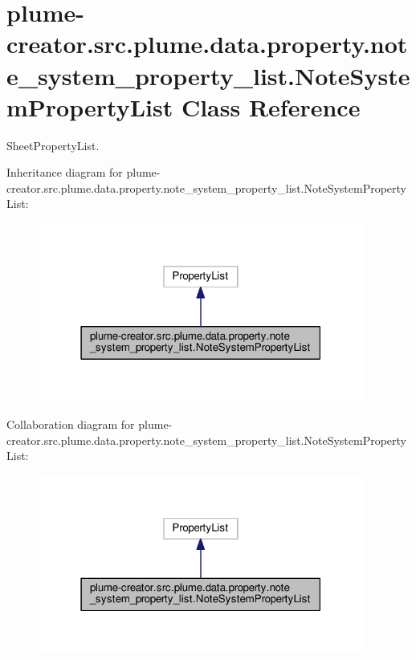 \hypertarget{classplume-creator_1_1src_1_1plume_1_1data_1_1property_1_1note__system__property__list_1_1_note_system_property_list}{}\section{plume-\/creator.src.\+plume.\+data.\+property.\+note\+\_\+system\+\_\+property\+\_\+list.\+Note\+System\+Property\+List Class Reference}
\label{classplume-creator_1_1src_1_1plume_1_1data_1_1property_1_1note__system__property__list_1_1_note_system_property_list}


Sheet\+Property\+List.  




Inheritance diagram for plume-\/creator.src.\+plume.\+data.\+property.\+note\+\_\+system\+\_\+property\+\_\+list.\+Note\+System\+Property\+List\+:\nopagebreak
\begin{figure}[H]
\begin{center}
\leavevmode
\includegraphics[width=303pt]{classplume-creator_1_1src_1_1plume_1_1data_1_1property_1_1note__system__property__list_1_1_note_00255cee95e005b6051b9b324d5f111d}
\end{center}
\end{figure}


Collaboration diagram for plume-\/creator.src.\+plume.\+data.\+property.\+note\+\_\+system\+\_\+property\+\_\+list.\+Note\+System\+Property\+List\+:\nopagebreak
\begin{figure}[H]
\begin{center}
\leavevmode
\includegraphics[width=303pt]{classplume-creator_1_1src_1_1plume_1_1data_1_1property_1_1note__system__property__list_1_1_note_62c22e56fa12a2ac6f0c2c7fdfc7c813}
\end{center}
\end{figure}
